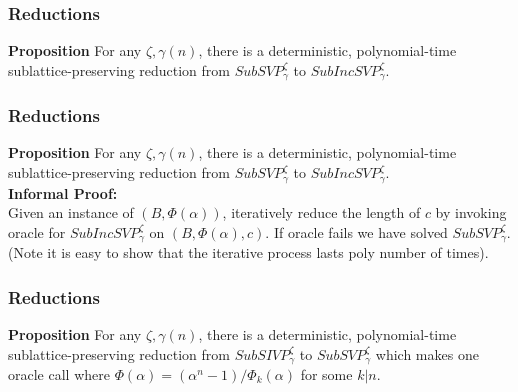 \documentclass{beamer}
\begin{document}
\begin{frame}
\frametitle{Reductions}
\textbf{Proposition} For any $\zeta, \gamma(n)$, there is a deterministic, polynomial-time sublattice-preserving
reduction from $SubSVP_\gamma^\zeta$ to $SubIncSVP_\gamma^\zeta$.
\end{frame}
\begin{frame}
	\frametitle{Reductions}
	\textbf{Proposition} For any $\zeta, \gamma(n)$, there is a deterministic, polynomial-time sublattice-preserving
	reduction from $SubSVP_\gamma^\zeta$ to $SubIncSVP_\gamma^\zeta$.
	\\
	\textbf{Informal Proof:}
	\\
	Given an instance of $(B,\Phi(\alpha))$, iteratively reduce the length of $c$ by invoking oracle for $SubIncSVP_\gamma^\zeta$ on $(B,\Phi(\alpha),c)$. If oracle fails we have solved $SubSVP_\gamma^\zeta$. (Note it is easy to show that the iterative process lasts poly number of times).
\end{frame}
\begin{frame}
	\frametitle{Reductions}
	\textbf{Proposition} For any $\zeta, \gamma(n)$, there is a deterministic, polynomial-time sublattice-preserving
	reduction from $SubSIVP_\gamma^\zeta$ to $SubSVP_\gamma^\zeta$ which makes one oracle call where $\Phi(\alpha) = (\alpha^n - 1)/\Phi_k(\alpha)$ for some $k | n$.
\end{frame}
\end{document}
